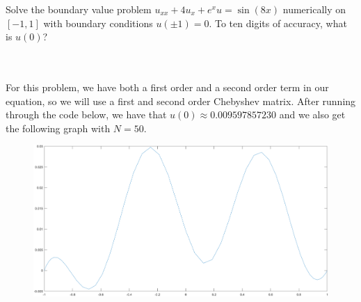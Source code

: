 Solve the boundary value problem $u_{xx}+4u_x+e^xu=\sin(8x)$ numerically on $[-1,1]$ with boundary
conditions $u(\pm1)=0$. To ten digits of accuracy, what is $u(0)$?\\\\

\begin{solution}\renewcommand{\qedsymbol}{}\ \\
    For this problem, we have both a first order and a second order term in our equation, so we will use
    a first and second order Chebyshev matrix. After running through the code below, we have that
    $u(0)\approx0.009597857230$ and we also get the following graph with $N=50$.

    \begin{figure}[htp]
        \centering
        \includegraphics[scale=0.14]{7_2.PNG}
    \end{figure}

\end{solution}

\newpage

\newpage 